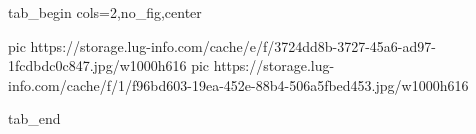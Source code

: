  
 
 
 
 


\ifcmt
  tab_begin cols=2,no_fig,center

     pic https://storage.lug-info.com/cache/e/f/3724dd8b-3727-45a6-ad97-1fcdbdc0c847.jpg/w1000h616
		 pic https://storage.lug-info.com/cache/f/1/f96bd603-19ea-452e-88b4-506a5fbed453.jpg/w1000h616

  tab_end
\fi
